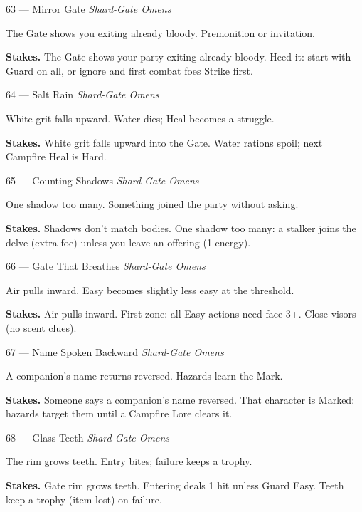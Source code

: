 \begin{encounterentry}{63 --- Mirror Gate}
\textit{Shard-Gate Omens}

The Gate shows you exiting already bloody. Premonition or invitation.

\textbf{Stakes.} The Gate shows your party exiting already bloody. Heed it: start with Guard on all, or ignore and first combat foes Strike first.
\end{encounterentry}

\begin{encounterentry}{64 --- Salt Rain}
\textit{Shard-Gate Omens}

White grit falls upward. Water dies; Heal becomes a struggle.

\textbf{Stakes.} White grit falls upward into the Gate. Water rations spoil; next Campfire Heal is Hard.
\end{encounterentry}

\begin{encounterentry}{65 --- Counting Shadows}
\textit{Shard-Gate Omens}

One shadow too many. Something joined the party without asking.

\textbf{Stakes.} Shadows don't match bodies. One shadow too many: a stalker joins the delve (extra foe) unless you leave an offering (1 energy).
\end{encounterentry}

\begin{encounterentry}{66 --- Gate That Breathes}
\textit{Shard-Gate Omens}

Air pulls inward. Easy becomes slightly less easy at the threshold.

\textbf{Stakes.} Air pulls inward. First zone: all Easy actions need face 3+. Close visors (no scent clues).
\end{encounterentry}

\begin{encounterentry}{67 --- Name Spoken Backward}
\textit{Shard-Gate Omens}

A companion's name returns reversed. Hazards learn the Mark.

\textbf{Stakes.} Someone says a companion's name reversed. That character is Marked: hazards target them until a Campfire Lore clears it.
\end{encounterentry}

\begin{encounterentry}{68 --- Glass Teeth}
\textit{Shard-Gate Omens}

The rim grows teeth. Entry bites; failure keeps a trophy.

\textbf{Stakes.} Gate rim grows teeth. Entering deals 1 hit unless Guard Easy. Teeth keep a trophy (item lost) on failure.
\end{encounterentry}

